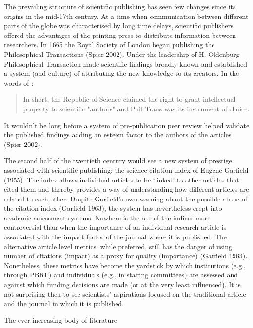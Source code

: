 \documentclass[final,authoryear,3p]{elsarticle-open-drafting}
\begin{document}
The prevailing structure of scientific publishing has seen few changes since its origins in the mid-17th century. At a time when communication between different parts of the globe was characterised by long time delays, scientific publishers offered the advantages of the printing press to distribute information between researchers. In 1665 the Royal Society of London began publishing the Philosophical Transactions (Spier 2002).
Under the leadership of H. Oldenburg Philosophical Transaction made scientific findings broadly known and established a system (and culture) of attributing the new knowledge to its creators. In the words of  \href{http://www.webcitation.org/5zE16KjXJ}{\citep{guedon2001ols}}: 
\begin{quote}
In short, the Republic of Science claimed the right to grant intellectual property to scientific "authors" and Phil Trans was its instrument of choice.  
\end{quote}

It wouldn’t be long before a system of pre-publication peer review helped validate the published findings adding an esteem factor to the authors of the articles (Spier 2002). 

The second half of the twentieth century would see a new system of prestige associated with scientific publishing: the science citation index of Eugene Garfield (1955). The index allows individual articles to be ‘linked’ to other articles that cited them and thereby provides a way of understanding how different articles are related to each other.  Despite Garfield’s own warning about the possible abuse of the citation index (Garfield 1963), the system has nevertheless crept into academic assessment systems. Nowhere is the use of the indices more controversial than when the importance of an individual research article is associated with the impact factor of the journal where it is published. The alternative article level metrics, while preferred, still has the danger of using number of citations (impact) as a proxy for quality (importance) (Garfield 1963). Nonetheless, these metrics have become the yardstick by which institutions (e.g., through PBRF) and individuals (e.g., in staffing committees) are assessed and against which funding decisions are made (or at the very least influenced). It is not surprising then to see scientists’ aspirations focused on the traditional article and the journal in which it is published.

The ever increasing body of literature
\end{document}

